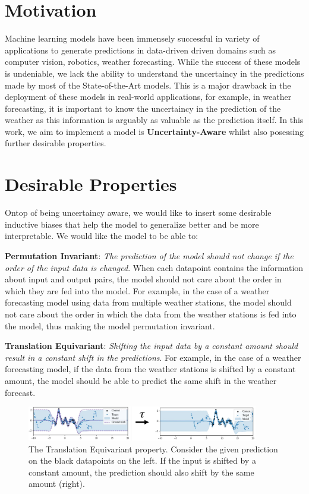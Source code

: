 \documentclass[../../main.tex]{subfiles}
\begin{document}
\section{Motivation}

Machine learning models have been immensely successful in variety of applications to generate predictions in data-driven driven domains such as computer vision, robotics, weather forecasting. While the success of these models is undeniable, we lack the ability to understand the uncertaincy in the predictions made by most of the State-of-the-Art models. This is a major drawback in the deployment of these models in real-world applications, for example, in weather forecasting, it is important to know the uncertaincy in the prediction of the weather as this information is arguably as valuable as the prediction itself. In this work, we aim to implement a model is \textbf{Uncertainty-Aware} whilst also posessing further desirable properties.

\section{Desirable Properties}

Ontop of being uncertaincy aware, we would like to insert some desirable inductive biases that help the model to generalize better and be more interpretable. We would like the model to be able to:

\textbf{Permutation Invariant}: \emph{The prediction of the model should not change if the order of the input data is changed}. When each datapoint contains the information about input and output pairs, the model should not care about the order in which they are fed into the model. For example, in the case of a weather forecasting model using data from multiple weather stations, the model should not care about the order in which the data from the weather stations is fed into the model, thus making the model permutation invariant.

\textbf{Translation Equivariant}: \emph{Shifting the input data by a constant amount should result in a constant shift in the predictions}. For example, in the case of a weather forecasting model, if the data from the weather stations is shifted by a constant amount, the model should be able to predict the same shift in the weather forecast.

\begin{figure}[H]
	\centering
	\includegraphics[width=0.9\textwidth]{./te.PNG}
	\caption{The Translation Equivariant property. Consider the given prediction on the black datapoints on the left. If the input is shifted by a constant amount, the prediction should also shift by the same amount (right).}
	\label{fig:te}
\end{figure}
\end{document}
